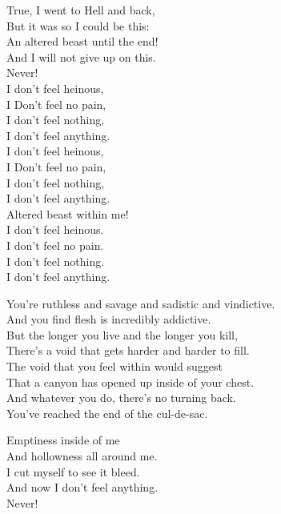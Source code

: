 True, I went to Hell and back, \\
But it was so I could be this: \\
An altered beast until the end! \\
And I will not give up on this. \\
Never! \\

I don't feel heinous, \\
I Don't feel no pain, \\
I don't feel nothing, \\
I don't feel anything. \\
I don't feel heinous, \\
I Don't feel no pain, \\
I don't feel nothing, \\
I don't feel anything. \\
Altered beast within me! \\

I don't feel heinous. \\
I don't feel no pain. \\
I don't feel nothing. \\
I don't feel anything. \\


You're ruthless and savage and sadistic and vindictive. \\
And you find  flesh is incredibly addictive. \\

But the longer you live and the longer you kill, \\
There's a void that gets harder and harder to fill. \\

The void that you feel within would suggest \\
That a canyon has opened up inside of your chest. \\

And whatever you do, there's no turning back. \\
You've reached the end of the cul-de-sac. \\


Emptiness inside of me \\
And hollowness all around me. \\
I cut myself to see it bleed. \\
And now I don't feel anything. \\
Never! \\

